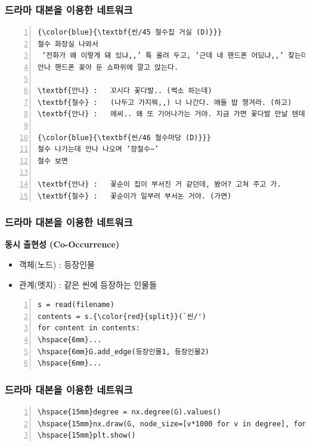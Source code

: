 \documentclass{beamer}
\newcommand{\fbckg}[1]{\usebackgroundtemplate{\texttt{[image: \#1]}}}%
\begin{document}
\begin{frame}[fragile]
\frametitle{드라마 대본을 이용한 네트워크}
\begin{block}{}
\scriptsize
	\begin{Verbatim}[numbers=left,commandchars=\\\{\}]
{\color{blue}{\textbf{씬/45 철수집 거실 (D)}}}
철수 화장실 나와서
 ‘전화가 왜 이렇게 돼 있냐,,’ 툭 올려 두고, ‘근데 내 핸드폰 어딨냐,,’ 찾는데
안나 핸드폰 꽂아 둔 쇼파위에 깔고 앉는다.

\textbf{안나}	:	꼬시다 꽃다발.. (썩소 하는데)
\textbf{철수}	:	(나두고 가지뭐,,) 나 나간다. 애들 밥 챙겨라. (하고)
\textbf{안나}	:	에씨.. 왜 또 기어나가는 거야. 지금 가면 꽃다발 만날 텐데..

{\color{blue}{\textbf{씬/46 철수마당 (D)}}}
철수 나가는데 안나 나오며 ‘장철수~’
철수 보면

\textbf{안나}	:	꽃순이 집이 부서진 거 같던데, 봤어? 고쳐 주고 가.
\textbf{철수}	:	꽃순이가 일부러 부서논 거야. (가면)
	\end{Verbatim}
\end{block}
\end{frame}

\begin{frame}[fragile]
\frametitle{드라마 대본을 이용한 네트워크}
\textbf{동시 출현성 (Co-Occurrence)}
\begin{itemize}
\item 객체(노드) : 등장인물\\
\item 관계(엣지) : 같은 씬에 등장하는 인물들
\end{itemize}
\begin{block}{}
\scriptsize
\begin{Verbatim}[numbers=left,commandchars=\\\{\}]
s = read(filename)
contents = s.{\color{red}{split}}(`씬/')
for content in contents:
\hspace{6mm}...
\hspace{6mm}G.add_edge(등장인물1, 등장인물2)
\hspace{6mm}...

\end{Verbatim}
\end{block}
\end{frame}

{
\fbckg{couple_network1.png}
\begin{frame}[fragile]
\frametitle{드라마 대본을 이용한 네트워크}
\scriptsize
\begin{Verbatim}[numbers=left,commandchars=\\\{\}]
\hspace{15mm}degree = nx.degree(G).values()
\hspace{15mm}nx.draw(G, node_size=[v*1000 for v in degree], font_size=30)
\hspace{15mm}plt.show()
\end{Verbatim}
\vspace{7cm}
\end{frame}
}
\end{document}
